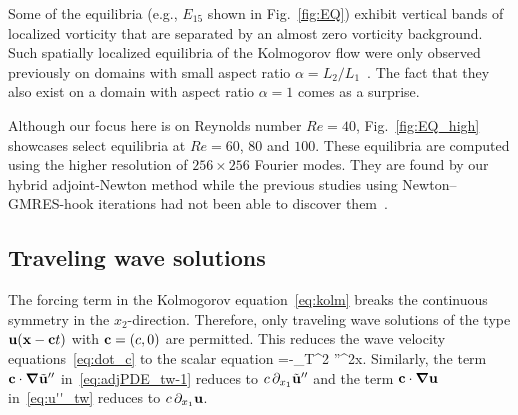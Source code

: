 \documentclass{article}
\begin{document}
Some of the equilibria (e.g., $E_{15}$ shown in Fig.~\ref{fig:EQ}) exhibit vertical bands
of localized vorticity that are separated by an almost zero vorticity background.
Such spatially localized equilibria of
the Kolmogorov flow were only observed previously on domains with small aspect ratio
$\alpha=L_2/L_1$~\citep{LK14}. The fact that they also exist on a domain with
aspect ratio $\alpha=1$ comes as a surprise.

Although our focus here is on Reynolds number $Re=40$,
Fig.~\ref{fig:EQ_high} showcases select equilibria
at $Re=60$, $80$ and $100$.
These equilibria are computed using the higher resolution of $256\times 256$ Fourier modes.
They are found by our hybrid adjoint-Newton method while
the previous studies using Newton--GMRES-hook iterations had not been
able to discover them~\citep{CK13}.

\subsection{Traveling wave solutions}
The forcing term in the Kolmogorov equation~\eqref{eq:kolm}
breaks the continuous symmetry in the $x_2$-direction. Therefore, only traveling wave
solutions of the type $\mathbf u(\mathbf x-\mathbf ct)$ with $\mathbf c=(c,0)$ are permitted.
This reduces the wave velocity equations~\eqref{eq:dot_c} to the scalar equation
\beq
{}=-\int_{\mathbb T^2}
\cdot{}''\;^2\vc x.
\eeq
Similarly, the term $\mathbf c\cdot\mbox{\boldmath $\nabla$}\tilde{\mathbf u}''$ in~\eqref{eq:adjPDE_tw-1} reduces to
$c\,\partial_{x_1}\tilde{\mathbf u}''$ and the term $\mathbf c\cdot\mbox{\boldmath $\nabla$}\mathbf u$
in~\eqref{eq:u''_tw} reduces to $c\,\partial_{x_1}\mathbf u$.
\end{document}
